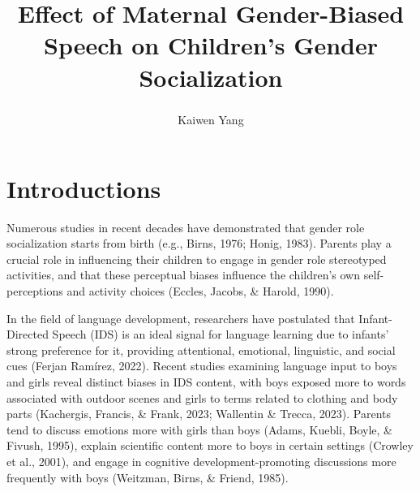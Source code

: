 \documentclass[
  man]{apa6}
\title{Effect of Maternal Gender-Biased Speech on Children's Gender Socialization}
\author{Kaiwen Yang\textsuperscript{}}
\date{}
\affiliation{\phantom{0}}
\begin{document}
\maketitle

\hypertarget{introductions}{%
\section{Introductions}\label{introductions}}

Numerous studies in recent decades have demonstrated that gender role socialization starts from birth (e.g., Birns, 1976; Honig, 1983). Parents play a crucial role in influencing their children to engage in gender role stereotyped activities, and that these perceptual biases influence the children's own self-perceptions and activity choices (Eccles, Jacobs, \& Harold, 1990).

In the field of language development, researchers have postulated that Infant-Directed Speech (IDS) is an ideal signal for language learning due to infants' strong preference for it, providing attentional, emotional, linguistic, and social cues (Ferjan Ramírez, 2022). Recent studies examining language input to boys and girls reveal distinct biases in IDS content, with boys exposed more to words associated with outdoor scenes and girls to terms related to clothing and body parts (Kachergis, Francis, \& Frank, 2023; Wallentin \& Trecca, 2023). Parents tend to discuss emotions more with girls than boys (Adams, Kuebli, Boyle, \& Fivush, 1995), explain scientific content more to boys in certain settings (Crowley et al., 2001), and engage in cognitive development-promoting discussions more frequently with boys (Weitzman, Birns, \& Friend, 1985).
\end{document}

